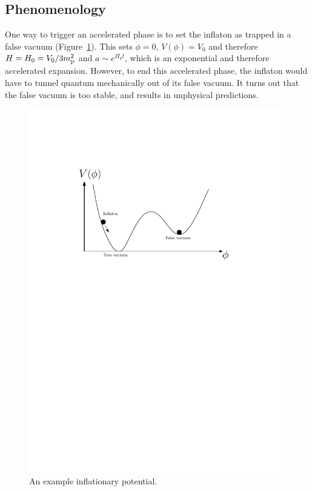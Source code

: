 \subsection{Phenomenology}
One way to trigger an accelerated phase is to set the inflaton as trapped in a false vacuum (Figure~\ref{fig:cos:potential}). This sets $\dot{\phi}=0$, $V(\phi)=V_0$ and therefore $H=H_0=V_0/3m_{\mathrm{p}}^2$ and $a\sim e^{H_0t}$, which is an exponential and therefore accelerated expansion. However, to end this accelerated phase, the inflaton would have to tunnel quantum mechanically out of its false vacuum. It turns out that the false vacuum is too stable, and results in unphysical predictions.

\begin{figure}[tp]
  \centering
  \includegraphics[width=\textwidth]{chapters/inflationary_cosmology/figures/potential}
  \caption{An example inflationary potential.}\label{fig:cos:potential}
\end{figure}

